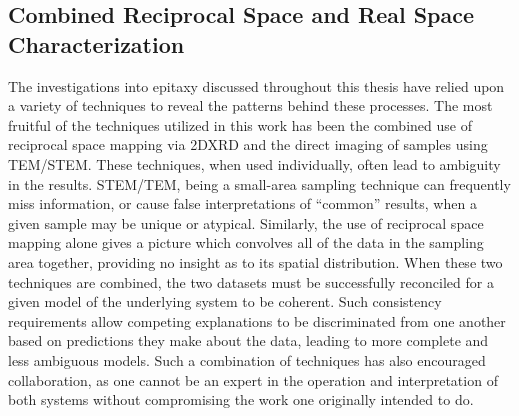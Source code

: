 \subsection{Combined Reciprocal Space and Real Space Characterization}
The investigations into epitaxy discussed throughout this thesis have relied upon a variety of techniques to reveal the patterns behind these processes. The most fruitful of the techniques utilized in this work has been the combined use of reciprocal space mapping via 2DXRD and the direct imaging of samples using TEM/STEM. These techniques, when used individually, often lead to ambiguity in the results. STEM/TEM, being a small-area sampling technique can frequently miss information, or cause false interpretations of ``common'' results, when a given sample may be unique or atypical. Similarly, the use of reciprocal space mapping alone gives a picture which convolves all of the data in the sampling area together, providing no insight as to its spatial distribution. When these two techniques are combined, the two datasets must be successfully reconciled for a given model of the underlying system to be coherent. Such consistency requirements allow competing explanations to be discriminated from one another based on predictions they make about the data, leading to more complete and less ambiguous models. Such a combination of techniques has also encouraged collaboration, as one cannot be an expert in the operation and interpretation of both systems without compromising the work one originally intended to do.